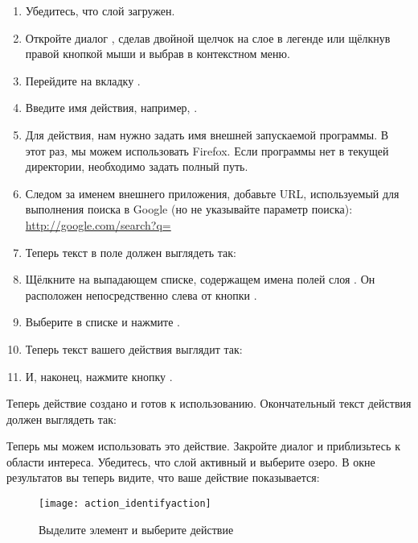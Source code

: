 \begin{enumerate}
\item Убедитесь, что слой  загружен.
\item Откройте диалог , сделав двойной щелчок на слое в
легенде или щёлкнув правой кнопкой мыши и выбрав  в
контекстном меню.
\item Перейдите на вкладку .
\item Введите имя действия, например, .
\item Для действия, нам нужно задать имя внешней запускаемой программы.
В этот раз, мы можем использовать Firefox. Если программы нет в текущей
директории, необходимо задать полный путь.
\item Следом за именем внешнего приложения, добавьте URL, используемый для
выполнения поиска в Google (но не указывайте параметр поиска):
\url{http://google.com/search?q=}
\item Теперь текст в поле  должен выглядеть так:\\
\item Щёлкните на выпадающем списке, содержащем имена полей
слоя . Он расположен непосредственно слева от кнопки
.
\item Выберите в списке  и
нажмите .
\item Теперь текст вашего действия выглядит так:\\
\item И, наконец, нажмите кнопку .
\end{enumerate}

Теперь действие создано и готов к использованию. Окончательный текст
действия должен выглядеть так:


Теперь мы можем использовать это действие. Закройте диалог 
и приблизьтесь к области интереса. Убедитесь, что слой 
активный и выберите озеро. В окне результатов вы теперь видите, что ваше
действие показывается:

\begin{figure}[ht]
   \centering
   \texttt{[image: action\_identifyaction]}
   \caption{Выделите элемент и выберите действие \wincaption}\label{fig:identify_action}
\end{figure}

